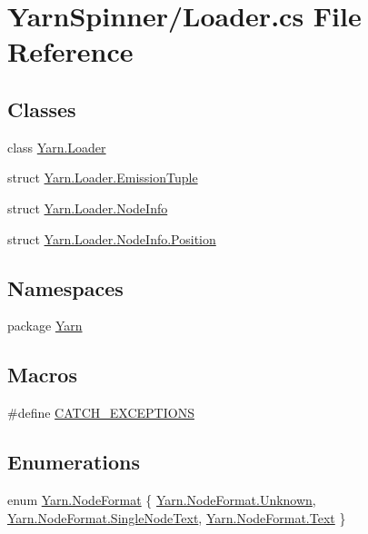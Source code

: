 \hypertarget{a00291}{\section{Yarn\-Spinner/\-Loader.cs File Reference}
\label{a00291}
}
\subsection*{Classes}
\begin{DoxyCompactItemize}
\item 
class \hyperlink{a00127}{Yarn.\-Loader}
\item 
struct \hyperlink{a00095}{Yarn.\-Loader.\-Emission\-Tuple}
\item 
struct \hyperlink{a00133}{Yarn.\-Loader.\-Node\-Info}
\item 
struct \hyperlink{a00139}{Yarn.\-Loader.\-Node\-Info.\-Position}
\end{DoxyCompactItemize}
\subsection*{Namespaces}
\begin{DoxyCompactItemize}
\item 
package \hyperlink{a00050}{Yarn}
\end{DoxyCompactItemize}
\subsection*{Macros}
\begin{DoxyCompactItemize}
\item 
\#define \hyperlink{a00291_a77a5bfa27437777ac8554e94e76e4e43}{C\-A\-T\-C\-H\-\_\-\-E\-X\-C\-E\-P\-T\-I\-O\-N\-S}
\end{DoxyCompactItemize}
\subsection*{Enumerations}
\begin{DoxyCompactItemize}
\item 
enum \hyperlink{a00050_ad7ebb46e7309ead8767383a672b3272f}{Yarn.\-Node\-Format} \{ \hyperlink{a00050_ad7ebb46e7309ead8767383a672b3272fa88183b946cc5f0e8c96b2e66e1c74a7e}{Yarn.\-Node\-Format.\-Unknown}, 
\hyperlink{a00050_ad7ebb46e7309ead8767383a672b3272faceeb33da53902872b63956f8df786cd8}{Yarn.\-Node\-Format.\-Single\-Node\-Text}, 
\hyperlink{a00050_ad7ebb46e7309ead8767383a672b3272fa9dffbf69ffba8bc38bc4e01abf4b1675}{Yarn.\-Node\-Format.\-Text}
 \}
\end{DoxyCompactItemize}


